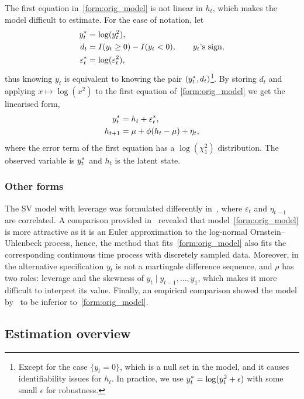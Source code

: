 The first equation in~\eqref{form:orig_model} is not linear in $h_t$, which makes the model difficult to estimate. For the ease of notation, let
\begin{align*}
y_t^\ast &=\log(y^2_t), \\
d_t &=I(y_t\ge0)-I(y_t<0), \qquad\text{$y_t$'s sign,} \\
\varepsilon_t^\ast &=\log(\varepsilon^2_t),
\end{align*}
thus knowing $y_t$ is equivalent to knowing the pair $(y_t^\ast, d_t)$\footnote{Except for the case $\{y_t=0\}$, which is a null set in the model, and it causes identifiability issues for $h_t$. In practice, we use $y_t^\ast =\log(y^2_t+\epsilon)$ with some small $\epsilon$ for robustness.}. By storing $d_t$ and applying $x\mapsto\log(x^2)$ to the first equation of~\eqref{form:orig_model} we get the linearised form,
\begin{align}
\begin{split}\label{form:lin_model}
y_t^\ast & = h_t+\varepsilon_t^\ast, \\
h_{t+1} & = \mu+\phi(h_t-\mu)+\eta_t,
\end{split}
\end{align}
where the error term of the first equation has a $\log(\chi_1^2)$ distribution. The observed variable is $y_t^\ast$ and $h_t$ is the latent state.

\subsubsection{Other forms}

The SV model with leverage was formulated differently in~\citet{Jacquier2004}, where $\varepsilon_t$ and $\eta_{t-1}$ are correlated.
A comparison provided in~\citet{yu2005leverage} revealed that model~\ref{form:orig_model} is more attractive as it is an Euler approximation to the log-normal Ornstein--Uhlenbeck process, hence, the method that fits~\ref{form:orig_model} also fits the corresponding continuous time process with discretely sampled data.
Moreover, in the alternative specification $y_t$ is not a martingale difference sequence, and $\rho$ has two roles: leverage and the skewness of $y_t\mid y_{t-1},\dots,y_1$, which makes it more difficult to interpret its value.
Finally, an empirical comparison showed the model by~\citeauthor{Jacquier2004} to be inferior to~\ref{form:orig_model}.

\subsection{Estimation overview}

